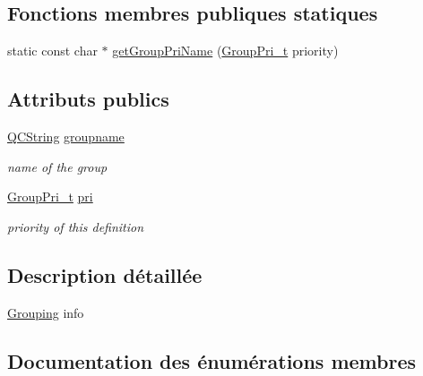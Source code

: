 \subsection*{Fonctions membres publiques statiques}
\begin{DoxyCompactItemize}
\item 
static const char $\ast$ \hyperlink{struct_grouping_ae38a9f0b7428a2539810e4e782a740af}{get\+Group\+Pri\+Name} (\hyperlink{struct_grouping_a9f0ec5ab376b083ebe3274ea79fd2d70}{Group\+Pri\+\_\+t} priority)
\end{DoxyCompactItemize}
\subsection*{Attributs publics}
\begin{DoxyCompactItemize}
\item 
\hyperlink{class_q_c_string}{Q\+C\+String} \hyperlink{struct_grouping_a05e6a053a86cc2f588d065f3880801dc}{groupname}
\begin{DoxyCompactList}\small\item\em name of the group \end{DoxyCompactList}\item 
\hyperlink{struct_grouping_a9f0ec5ab376b083ebe3274ea79fd2d70}{Group\+Pri\+\_\+t} \hyperlink{struct_grouping_aead55d7198ceffe16cb82d2c114e4254}{pri}
\begin{DoxyCompactList}\small\item\em priority of this definition \end{DoxyCompactList}\end{DoxyCompactItemize}


\subsection{Description détaillée}
\hyperlink{struct_grouping}{Grouping} info 

\subsection{Documentation des énumérations membres}
\hypertarget{struct_grouping_a9f0ec5ab376b083ebe3274ea79fd2d70}{}
